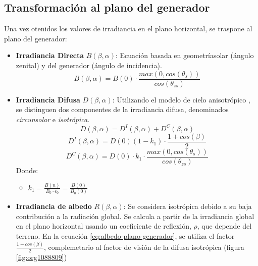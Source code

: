 \subsection{Transformación al plano del generador}
\label{sec:orgcce0ef8}
\label{subsec:transformación-plano-generador}
Una vez otenidos los valores de irradiancia en el plano horizontal, se traspone al plano del generador:
\begin{itemize}
\item \textbf{Irradiancia Directa} \(B(\beta ,\alpha)\): Ecuación basada en geometríasolar (ángulo zenital) y del generador (ángulo de incidencia).
\begin{equation}
B(\beta ,\alpha)=B(0)\cdot \frac{max(0,cos(\theta_s))}{cos(\theta_{zs})}
\label{eq:irradiancia-directa-plano-generador}
\end{equation}
\item \textbf{Irradiancia Difusa} \(D(\beta ,\alpha)\): Utilizando el modelo de cielo anisotrópico \cite{Perpinan2023}, se distinguen dos componentes de la irradiancia difusa, denominados \emph{circunsolar} e \emph{isotrópica}.  
\begin{equation}
D(\beta ,\alpha)=D^I(\beta ,\alpha)+D^C(\beta ,\alpha)
\end{equation}
\begin{equation}
D^I(\beta ,\alpha)=D(0)(1-k_1)\cdot \frac{1+cos(\beta)}{2}
\end{equation}
\begin{equation}
D^C(\beta, \alpha)=D(0)\cdot k_1\cdot \frac{max(0,cos(\theta_s))}{cos(\theta_{zs})}
\end{equation}
Donde:
\begin{itemize}
\item \(k_1=\frac{B(n)}{B_0\cdot \epsilon_0}=\frac{B(0)}{B_0(0)}\)
\end{itemize}
\item \textbf{Irradiancia de albedo} \(R(\beta ,\alpha)\): Se considera isotrópica debido a su baja contribución a la radiación global. Se calcula a partir de la irradiancia global en el plano horizontal usando un coeficiente de reflexión, \(\rho\), que depende del terreno. En la ecuación \ref{eq:albedo-plano-generador}, se utiliza el factor \(\frac{1-cos(\beta)}{2}\), complemetario al factor de visión de la difusa isotrópica (figura \ref{fig:org1088809})
\begin{equation}

\end{equation}
\end{itemize}
